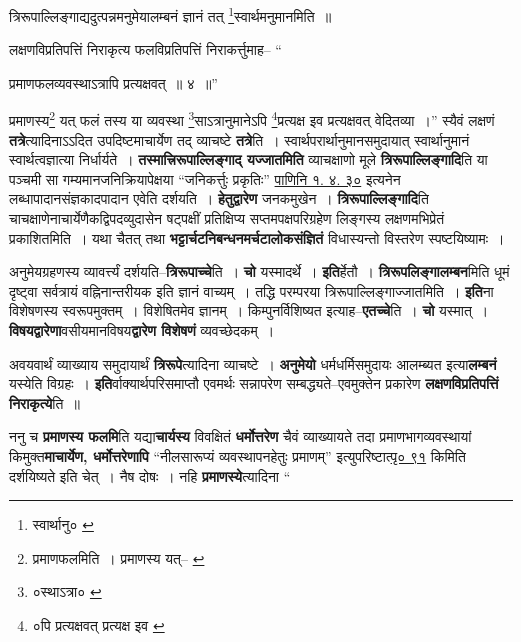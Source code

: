\documentclass[article,12pt,a4paper]{memoir}
\begin{document}
	त्रिरूपाल्लिङ्गाद्यदुत्पन्नमनुमेयालम्बनं ज्ञानं तत् \footnote{स्वार्थानु० \cite{dp-msD}}\-स्वार्थमनुमानमिति ॥ 
	  
	लक्षणविप्रतिपत्तिं निराकृत्य फलविप्रतिपत्तिं निराकर्त्तुमाह-- “
	  
	प्रमाणफलव्यवस्थाऽत्रापि प्रत्यक्षवत् ॥ ४ ॥” 
	  
	प्रमाणस्य\footnote{प्रमाणफलमिति । प्रमाणस्य यत्--\cite{dp-msB} \cite{dp-msC} \cite{dp-msD}} यत् फलं तस्य या व्यवस्था \footnote{०स्थाऽत्रा० \cite{dp-msA} \cite{dp-msB} \cite{dp-edP} \cite{dp-edH} \cite{dp-edE}}\-साऽत्रानुमानेऽपि \footnote{०पि प्रत्यक्षवत् प्रत्यक्ष इव \cite{dp-edP} \cite{dp-edH} \cite{dp-edE}}\-प्रत्यक्ष इव प्रत्यक्षवत् वेदितव्या ।” स्यैवं लक्षणं \textbf{तत्रे}त्यादिनाऽऽदित उपदिष्टमाचार्येण तद् व्याचष्टे \textbf{तत्रे}ति । स्वार्थपरार्थानुमानसमुदायात् स्वार्थानुमानं स्वार्थत्वज्ञात्या निर्धार्यते । \textbf{तस्मात्त्रिरूपाल्लिङ्गाद् यज्जातमिति} व्याचक्षाणो मूले \textbf{त्रिरूपाल्लिङ्गादि}ति या पञ्चमी सा गम्यमानजनिक्रियापेक्षया “जनिकर्त्तुः प्रकृतिः” \href{http://http://sarit.indology.info/?cref=Pā.1.4.30}{पाणिनि १. ४. ३०} इत्यनेन लब्धापादानसंज्ञकादपादान एवेति दर्शयति । \textbf{हेतुद्वारेण} जनकमुखेन । \textbf{त्रिरूपाल्लिङ्गादि}ति चाचक्षाणेनाचार्येणैकद्विपदव्युदासेन षट्पक्षीं प्रतिक्षिप्य सप्तमपक्षपरिग्रहेण लिङ्गस्य लक्षणमभिप्रेतं प्रकाशितमिति । यथा चैतत् तथा \textbf{भट्टार्चटनिबन्धनमर्चटालोकसंज्ञितं} विधास्यन्तो विस्तरेण स्पष्टयिष्यामः ।
	\pend
      

	  \pstart अनुमेयग्रहणस्य व्यावर्त्त्यं दर्शयति--\textbf{त्रिरूपाच्चे}ति । \textbf{चो} यस्मादर्थे । \textbf{इति}र्हेतौ । \textbf{त्रिरूपलिङ्गालम्बन}मिति धूमं दृष्ट्वा सर्वत्रायं वह्निनान्तरीयक इति ज्ञानं वाच्यम् । तद्धि परम्परया त्रिरूपाल्लिङ्गाज्जातमिति । \textbf{इति}ना विशेषणस्य स्वरूपमुक्तम् । विशेषितमेव ज्ञानम् । किम्पुनर्विशिष्यत इत्याह--\textbf{एतच्चे}ति । \textbf{चो} यस्मात् । \textbf{विषयद्वारेणा}वसीयमानविषय\textbf{द्वारेण विशेषणं} व्यवच्छेदकम् ।
	\pend
      

	  \pstart अवयवार्थं व्याख्याय समुदायार्थं \textbf{त्रिरूपे}त्यादिना व्याचष्टे । \textbf{अनुमेयो} धर्मधर्मिसमुदायः आलम्ब्यत इत्या\textbf{लम्बनं} यस्येति विग्रहः । \textbf{इति}र्वाक्यार्थपरिसमाप्तौ एवमर्थः सन्नापरेण सम्बद्ध्यते--एवमुक्तेन प्रकारेण \textbf{लक्षणविप्रतिपत्तिं निराकृत्ये}ति ॥
	\pend
      

	  \pstart ननु च \textbf{प्रमाणस्य फलमि}ति यद्या\textbf{चार्यस्य} विवक्षितं \textbf{धर्मोत्तरेण} चैवं व्याख्यायते तदा प्रमाणभागव्यवस्थायां किमुक्त\textbf{माचार्येण, धर्मोत्तरेणापि} “नीलसारूप्यं व्यवस्थापनहेतुः प्रमाणम्” इत्युपरिष्टात्\href{http://http://sarit.indology.info/?cref=p91}{पृ० ९१} किमिति दर्शयिष्यते इति चेत् । नैष दोषः । नहि \textbf{प्रमाणस्ये}त्यादिना  \leavevmode{} “
	  
\end{document}
